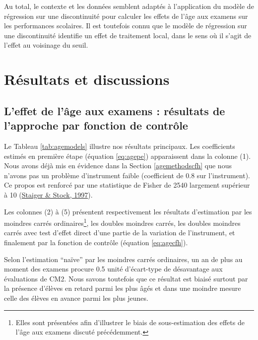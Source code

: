\documentclass[
]{book}
\begin{document}
\quad Au total, le contexte et les données semblent adaptés à l'application du modèle de régression sur une discontinuité pour calculer les effets de l'âge aux examens sur les performances scolaires. Il est toutefois connu que le modèle de régression sur une discontinuité identifie un effet de traitement local, dans le sens où il s'agit de l'effet au voisinage du seuil.

\hypertarget{ageres}{%
\section{Résultats et discussions}\label{ageres}}

\hypertarget{agemodelsres}{%
\subsection{L'effet de l'âge aux examens : résultats de l'approche par fonction de contrôle}\label{agemodelsres}}

Le Tableau \ref{tab:agemodels} illustre nos résultats principaux. Les coefficients estimés en première étape (équation \ref{eq:agepe}) apparaissent dans la colonne (1). Nous avons déjà mis en évidence dans la Section \ref{agemethodscfh} que nous n'avons pas un problème d'instrument faible (coefficient de 0.8 sur l'instrument). Ce propos est renforcé par une statistique de Fisher de 2540 largement supérieur à 10 (\protect\hyperlink{ref-STA:STO:97}{Staiger \& Stock, 1997}).

\quad Les colonnes (2) à (5) présentent respectivement les résultats d'estimation par les moindres carrés ordinaires\footnote{Elles sont présentées afin d'illustrer le biais de sous-estimation des effets de l'âge aux examens discuté précédemment.}, les doubles moindres carrés, les doubles moindres carrés avec test d'effet direct d'une partie de la variation de l'instrument, et finalement par la fonction de contrôle (équation \ref{eq:agecfh}).

\quad Selon l'estimation ``naïve'' par les moindres carrés ordinaires, un an de plus au moment des examens procure 0.5 unité d'écart-type de désavantage aux évaluations de CM2. Nous savons toutefois que ce résultat est biaisé surtout par la présence d'élèves en retard parmi les plus âgés et dans une moindre mesure celle des élèves en avance parmi les plus jeunes.
\end{document}

